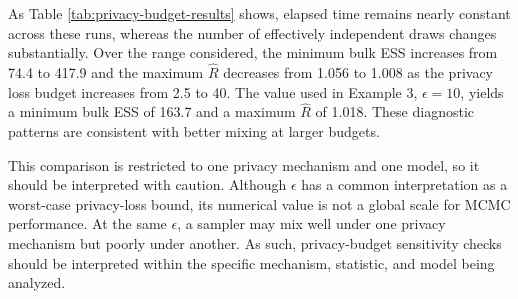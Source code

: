 \begin{table}[!h]
\centering
\caption{\label{tab:privacy-budget-results}Conjugate-regression mixing diagnostics across Laplace privacy loss budgets using coupled noise draws and a fixed MCMC configuration. Minimum bulk and tail ESS and maximum R-hat are taken across the model parameters. This experiment shows that the privacy loss budget can substantially affect mixing.}
\centering
{}
\end{table}

As Table \ref{tab:privacy-budget-results} shows, elapsed time remains nearly
constant across these runs, whereas the number of effectively independent
draws changes substantially. Over the range considered, the minimum bulk ESS
increases from 74.4 to 417.9 and the maximum \(\widehat{R}\) decreases from
1.056 to 1.008 as the privacy loss budget increases from 2.5 to 40. The
value used in Example 3, \(\epsilon=10\), yields a minimum bulk ESS of 163.7 and a maximum
\(\widehat{R}\) of 1.018. These diagnostic patterns are consistent with better mixing
at larger budgets.

This comparison is restricted to one privacy mechanism and one
model, so it should be interpreted with caution.
Although \(\epsilon\) has a common interpretation as a worst-case privacy-loss bound, its numerical value is not a global scale for MCMC performance. At the same \(\epsilon\), a sampler may mix well under one privacy mechanism but poorly under another.
As such, privacy-budget sensitivity checks should be interpreted within the
specific mechanism, statistic, and model being analyzed.

